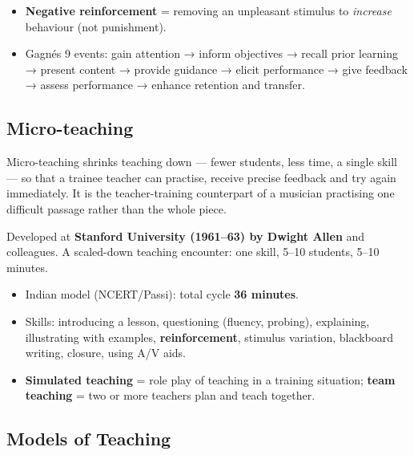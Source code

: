 \endgroup

\begin{itemize}
\tightlist
\item
  \textbf{Negative reinforcement} = removing an unpleasant stimulus to \emph{increase} behaviour (not punishment).
\item
  Gagné\textquotesingle s 9 events: gain attention → inform objectives → recall prior learning → present content → provide guidance → elicit performance → give feedback → assess performance → enhance retention and transfer.
\end{itemize}

\needspace{155pt}

\hypertarget{p1-01--72-micro-teaching}{%
\subsection{Micro-teaching}\label{p1-01--72-micro-teaching}}

Micro-teaching shrinks teaching down --- fewer students, less time, a single skill --- so that a trainee
teacher can practise, receive precise feedback and try again immediately. It is the teacher-training
counterpart of a musician practising one difficult passage rather than the whole piece.

Developed at \textbf{Stanford University (1961--63) by Dwight Allen} and colleagues. A scaled-down teaching encounter: one skill, 5--10 students, 5--10 minutes.



\begin{itemize}
\tightlist
\item
  Indian model (NCERT/Passi): total cycle \textbf{36 minutes}.
\item
  Skills: introducing a lesson, questioning (fluency, probing), explaining, illustrating with examples, \textbf{reinforcement}, stimulus variation, blackboard writing, closure, using A/V aids.
\item
  \textbf{Simulated teaching} = role play of teaching in a training situation; \textbf{team teaching} = two or more teachers plan and teach together.
\end{itemize}

\needspace{160pt}

\hypertarget{p1-01--73-models-of-teaching}{%
\subsection{Models of Teaching}\label{p1-01--73-models-of-teaching}}

